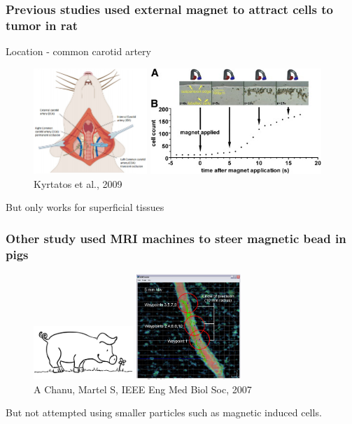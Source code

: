 \documentclass[8pt,xcolor=table]{beamer}
\begin{document}
\begin{frame}
\frametitle{Previous studies used external magnet to attract cells to tumor in rat}


Location - common carotid artery

\begin{figure}
\centering
\includegraphics[height=4cm]{rat_cca} \includegraphics[height=4cm]{external_magnet}\\
Kyrtatos  et al., 2009
\end{figure}

\vfill

But only works for superficial tissues
 
\end{frame}

\begin{frame}
\frametitle{Other study used MRI machines to steer magnetic bead in pigs}

\begin{figure}
\centering
\includegraphics[height=2cm]{pig_outline} \includegraphics[height=4cm]{pig_tube}\\
A Chanu, Martel S, IEEE Eng Med Biol Soc, 2007
\end{figure}

\vfill

But not attempted using smaller particles such as magnetic induced cells.
 
\end{frame}
\end{document}
